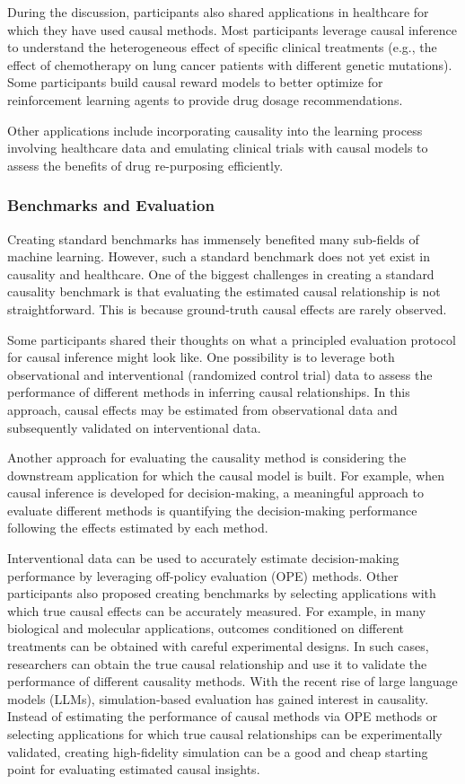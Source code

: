 During the discussion, participants also shared applications in healthcare for which they have used causal methods. Most participants leverage causal inference to understand the heterogeneous effect of specific clinical treatments (e.g., the effect of chemotherapy on lung cancer patients with different genetic mutations). 
Some participants build causal reward models to better optimize for reinforcement learning agents to provide drug dosage recommendations. 

Other applications include incorporating causality into the learning process involving healthcare data and emulating clinical trials with causal models to assess the benefits of drug re-purposing efficiently. 

\subsubsection{Benchmarks and Evaluation}

Creating standard benchmarks has immensely benefited many sub-fields of machine learning. However, such a standard benchmark does not yet exist in causality and healthcare. One of the biggest challenges in creating a standard causality benchmark is that evaluating the estimated causal relationship is not straightforward. This is because ground-truth causal effects are rarely observed. 

Some participants shared their thoughts on what a principled evaluation protocol for causal inference might look like. One possibility is to leverage both observational and interventional (randomized control trial) data to assess the performance of different methods in inferring causal relationships. In this approach, causal effects may be estimated from observational data and subsequently validated on interventional data. 

Another approach for evaluating the causality method is considering the downstream application for which the causal model is built. For example, when causal inference is developed for decision-making, a meaningful approach to evaluate different methods is quantifying the decision-making performance following the effects estimated by each method. 

Interventional data can be used to accurately estimate decision-making performance by leveraging off-policy evaluation (OPE) methods. Other participants also proposed creating benchmarks by selecting applications with which true causal effects can be accurately measured. For example, in many biological and molecular applications, outcomes conditioned on different treatments can be obtained with careful experimental designs. In such cases, researchers can obtain the true causal relationship and use it to validate the performance of different causality methods.
With the recent rise of large language models (LLMs), simulation-based evaluation has gained interest in causality. Instead of estimating the performance of causal methods via OPE methods or selecting applications for which true causal relationships can be experimentally validated, creating high-fidelity simulation can be a good and cheap starting point for evaluating estimated causal insights.

